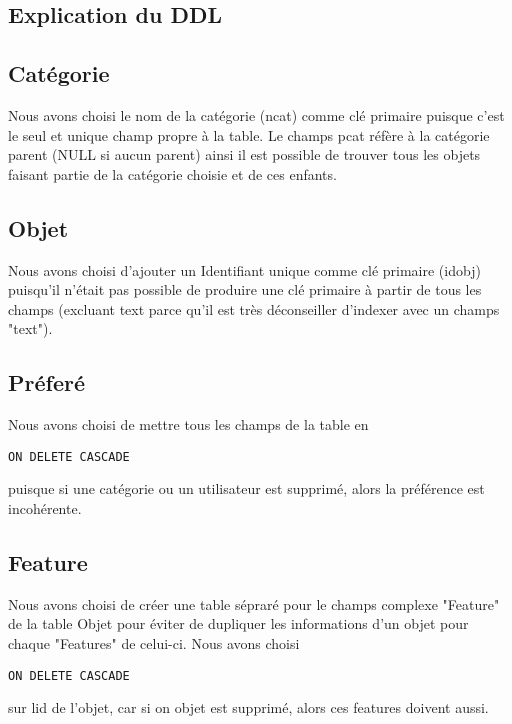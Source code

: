 \documentclass[a4paper,12pt]{article}
\begin{document}
\begin{spacing}{1}
	\section*{Explication du DDL}
	\subsection*{Catégorie}
	Nous avons choisi le nom de la catégorie (ncat) comme clé primaire puisque c'est le seul et unique champ propre à la table. Le champs pcat réfère à la catégorie parent (NULL si aucun parent) ainsi il est possible de trouver tous les objets faisant partie de la catégorie choisie et de ces enfants.
	\subsection*{Objet}
	Nous avons choisi d'ajouter un Identifiant unique comme clé primaire (idobj) puisqu'il n'était pas possible de produire une clé primaire à partir de tous les champs (excluant text parce qu'il est très déconseiller d'indexer avec un champs "text"). 
	\subsection*{Préferé}
	Nous avons choisi de mettre tous les champs de la table en \begin{verbatim}ON DELETE CASCADE\end{verbatim} puisque si une catégorie ou un utilisateur est supprimé, alors la préférence est incohérente. 
	\subsection*{Feature}
	Nous avons choisi de créer une table sépraré pour le champs complexe "Feature" de la table Objet pour éviter de dupliquer les informations d'un objet pour chaque "Features" de celui-ci. Nous avons choisi \begin{verbatim}ON DELETE CASCADE\end{verbatim} sur lid de l'objet, car si on objet est supprimé, alors ces features doivent aussi.

\end{spacing}
\end{document}
